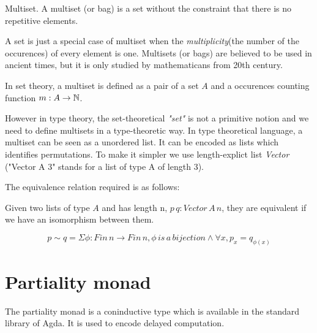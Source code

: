 \begin{definition}

Multiset. A multiset (or bag) is a set without the constraint that there is no repetitive elements.

\end{definition}

A set is just a special case of multiset when the
\emph{multiplicity}(the number of the occurences) of every element is one.
Multisets (or bags) are believed to be used in ancient times, but it
is only 
studied by mathematicans from 20th century.

In set theory, a multiset is defined as a pair of a set $A$ and a
occurences counting function $m : A \rightarrow \mathbb{N}$.

However in type theory, the set-theoretical \emph{"set"} is not a
primitive notion and we need to define multisets in a type-theoretic
way. 
In type theoretical language, a multiset can be seen as a unordered
list. It can be encoded as lists which identifies
permutations. To make it simpler we use length-explict list
\emph{Vector} ("Vector A 3" stands for a list of type A of length 3).


The equivalence relation required is as follows:

Given two lists of type $A$ and has length n, $p \, q : Vector\,A\,n$,
they are equivalent if we have an isomorphism between them.

$$ p \sim q = \Sigma \phi : Fin\,n \rightarrow Fin\,n, \phi\,is\,a\,
bijection \wedge \forall x, p_x = q_{\phi(x)}$$





\section{Partiality monad}

The partiality monad is a coninductive type which is available in the
standard library of Agda. It is used to encode delayed computation.

\begin{code}
\\
\>  \AgdaSymbol{(} \AgdaSymbol{:} \AgdaSymbol{)} \AgdaSymbol{:}  \<%
\\
\>[0]\<[2]%
\>[2] \AgdaSymbol{:}    \<%
\\
\>[0]\<[2]%
\>[2] \AgdaSymbol{:}  \AgdaSymbol{(} \AgdaSymbol{)}   \<%
\\
\end{code}

